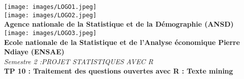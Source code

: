\documentclass[
]{article}
\author{}
\date{\vspace{-2.5em}}
\begin{document}
\begin{titlepage}
    \begin{center}
        \texttt{[image: images/LOGO1.jpeg]} \\[0.1cm]  
        
        \texttt{[image: images/LOGO2.jpeg]} \\[0.1cm] 
        
        \textbf{\large Agence nationale de la Statistique et de la Démographie (ANSD)}\\[0.2cm]
        
        \texttt{[image: images/LOGO3.jpeg]} \\[0.1cm]
        
        \textbf{\large Ecole nationale de la Statistique et de l'Analyse économique Pierre Ndiaye (ENSAE)}\\[0.4cm]
        
        \textit{\LARGE Semestre 2 :PROJET STATISTIQUES AVEC R }\\[0.3cm]
        \textbf{\Huge \color{green} \textsf{TP 10 : Traitement des questions ouvertes avec R : Texte mining}}\\[0.2cm]
        

\end{center}
\end{titlepage}
\end{document}
